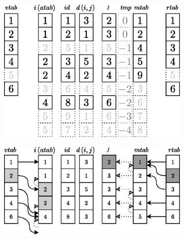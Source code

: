 \begin{figure}[!htbp]
	\ContinuedFloat
	\centering
	\begin{subfigure}[b]{0.4\textwidth}
		\includegraphics[width=\textwidth]{Chapter_I/7/1_7c.eps}
		\caption{}
	\end{subfigure}%
	\qquad
	\begin{subfigure}[b]{0.55\textwidth}
		\includegraphics[width=\textwidth]{Chapter_I/7/1_7d.eps}
		\caption{}
	\end{subfigure}

\end{figure}
